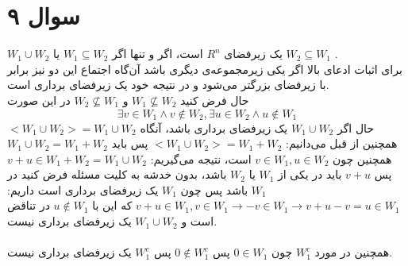 \documentclass[12pt,a4paper]{article}
\begin{document}
\section{سوال ۹}
$W_1 \cup W_2$
یک زیرفضای 
$R^n$
است، اگر و تنها اگر 
$W_1 \subseteq W_2$
یا
$W_2 \subseteq W_1$
.
\\
برای اثبات ادعای بالا اگر یکی زیرمجموعه‌ی دیگری باشد آن‌گاه اجتماع این دو نیز برابر با زیرفضای بزرگتر می‌شود و در نتیجه خود یک زیرفضای برداری است.
\\
حال فرض کنید 
$W_1 \nsubseteq W_2$ 
و
$W_2 \nsubseteq W_1$
در این صورت 
\[
\exists v \in W_1 \land v \notin W_2, \exists u \in W_2 \land u \notin W_1
\]
حال اگر 
$W_1 \cup W_2$
یک زیرفضای برداری باشد،‌ آنگاه
$<W_1 \cup W_2> = W_1 \cup W_2$
همچنین از قبل می‌دانیم:
$<W_1 \cup W_2> = W_1 + W_2$
پس باید
$W_1 \cup W_2 = W_1 + W_2$
همچنین چون 
$v \in W_1, u \in W_2$
است، نتیجه می‌گیریم:
$v+u \in W_1 + W_2 = W_1 \cup W_2$
پس $v+u$ باید در یکی از $W_1$ یا $W_2$ باشد، بدون خدشه به کلیت مسئله فرض کنید در $W_1$ باشد پس چون $W_1$ یک زیرفضای برداری است داریم:
$v+u \in W_1, v \in W_1 \rightarrow -v \in W_1 \rightarrow v+u-v = u \in W_1$
که این با 
$u \notin W_1$
در تناقض است و $W_1 \cup W_2$ یک زیرفضای برداری نیست.
\\
\\
همچنین در مورد $W_1^c$ چون 
$0 \in W_1$
پس
$0 \notin W_1^c$
پس $W_1^c$ یک زیرفضای برداری نیست.
\end{document}
